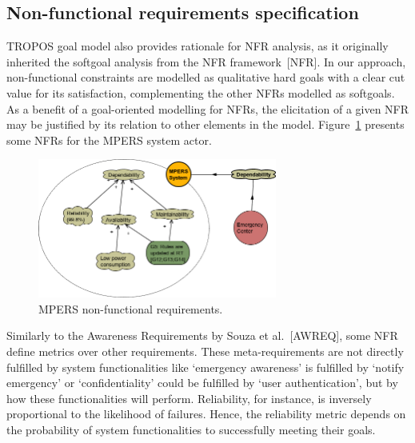 \subsection{Non-functional requirements specification}


TROPOS goal model also provides rationale for NFR analysis, as it originally inherited the softgoal analysis from the NFR framework~[NFR]. In our approach, non-functional constraints are modelled as qualitative hard goals with a clear cut value for its satisfaction, complementing the other NFRs modelled as softgoals. As a benefit of a goal-oriented modelling for NFRs, the elicitation of a given NFR may be justified by its relation to other elements in the model. Figure~\ref{fig:MPERS_NFR} presents some NFRs for the MPERS system actor.

\begin{figure}[h!]
\centering
\includegraphics[width=0.7\textwidth]{imgs/MPERS_NFR.png}
\caption{MPERS non-functional requirements.}
\label{fig:MPERS_NFR}
\end{figure}

Similarly to the Awareness Requirements by Souza et al.~[AWREQ], some NFR define metrics over other requirements. These meta-requirements are not directly fulfilled by system functionalities like `emergency awareness' is fulfilled by `notify emergency' or `confidentiality' could be fulfilled by `user authentication', but by how these functionalities will perform. Reliability, for instance, is inversely proportional to the likelihood of failures. Hence, the reliability metric depends on the probability of system functionalities to successfully meeting their goals. 


